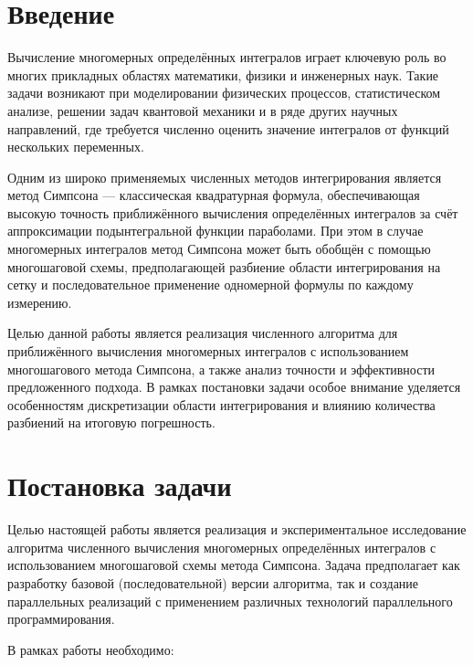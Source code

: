 \documentclass[14pt,a4paper]{extarticle}
\begin{document}
\tableofcontents
\newpage

\section{Введение}

Вычисление многомерных определённых интегралов играет ключевую роль во многих прикладных областях математики, физики и инженерных наук. Такие задачи возникают при моделировании физических процессов, статистическом анализе, решении задач квантовой механики и в ряде других научных направлений, где требуется численно оценить значение интегралов от функций нескольких переменных.

Одним из широко применяемых численных методов интегрирования является метод Симпсона — классическая квадратурная формула, обеспечивающая высокую точность приближённого вычисления определённых интегралов за счёт аппроксимации подынтегральной функции параболами. При этом в случае многомерных интегралов метод Симпсона может быть обобщён с помощью многошаговой схемы, предполагающей разбиение области интегрирования на сетку и последовательное применение одномерной формулы по каждому измерению.

Целью данной работы является реализация численного алгоритма для приближённого вычисления многомерных интегралов с использованием многошагового метода Симпсона, а также анализ точности и эффективности предложенного подхода. В рамках постановки задачи особое внимание уделяется особенностям дискретизации области интегрирования и влиянию количества разбиений на итоговую погрешность.

\section*{Постановка задачи}

Целью настоящей работы является реализация и экспериментальное исследование алгоритма численного вычисления многомерных определённых интегралов с использованием многошаговой схемы метода Симпсона. Задача предполагает как разработку базовой (последовательной) версии алгоритма, так и создание параллельных реализаций с применением различных технологий параллельного программирования.

В рамках работы необходимо:
\end{document}
